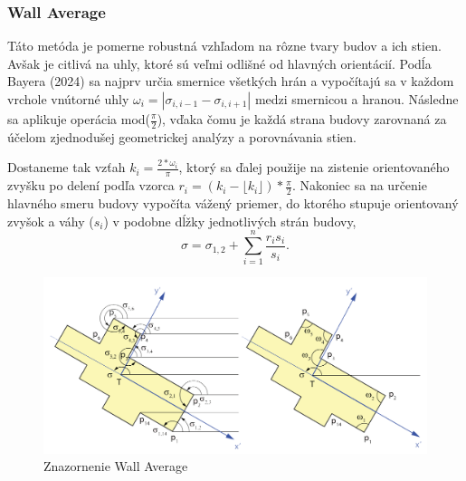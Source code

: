 \documentclass[12pt]{article}
\begin{document}
\subsubsection*{Wall Average}
Táto metóda je pomerne robustná vzhľadom na rôzne tvary budov a ich stien. Avšak je citlivá na uhly, ktoré sú veľmi odlišné od hlavných orientácií.  Podĺa Bayera (2024) sa najprv určia smernice všetkých hrán a vypočítajú sa v každom vrchole vnútorné uhly $\omega_{i}=|\sigma_{i,i-1}-\sigma_{i,i+1}|$ medzi smernicou a hranou. Následne sa aplikuje operácia mod($\frac{\pi}{2}$), vďaka čomu je každá strana budovy zarovnaná za účelom zjednodušej geometrickej analýzy a porovnávania stien.\par  Dostaneme tak vzťah $k_{i}=\frac{2*\omega_{i}}{\pi}$, ktorý sa ďalej použije na zistenie orientovaného zvyšku po delení podľa vzorca $r_{i} = (k_{i} - \lfloor k_{i} \rfloor)*\frac{\pi}{2} $. Nakoniec sa na určenie hlavného smeru budovy vypočíta vážený priemer, do ktorého stupuje orientovaný zvyšok a váhy ($s_{i}$) v podobne dĺžky jednotlivých strán budovy, $$ \sigma = \sigma_{1, 2} + \sum_{i=1}^{n}\frac{r_{i}s_{i}}{s_{i}}. $$   
\begin{figure} [h]
    \centering
    \includegraphics[width=1\linewidth]{latex/image/wa.png}
    \caption{Znazornenie Wall Average}
    \label{fig:enter-label}
\end{figure}
\newpage
\end{document}
